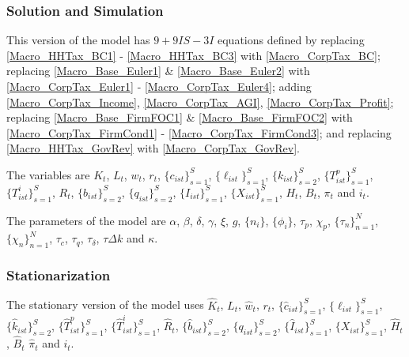 \documentclass[letterpaper,12pt]{article}
\theoremstyle{definition}
\numberwithin{equation}{section}
\begin{document}
\begin{spacing}{1.5}
    \subsubsection{Solution and Simulation}
      This version of the model has $9+9IS-3I$ equations defined by replacing \eqref{Macro_HHTax_BC1} - \eqref{Macro_HHTax_BC3} with \eqref{Macro_CorpTax_BC}; replacing \eqref{Macro_Base_Euler1} \& \eqref{Macro_Base_Euler2} with \eqref{Macro_CorpTax_Euler1} - \eqref{Macro_CorpTax_Euler4}; adding \eqref{Macro_CorpTax_Income}, \eqref{Macro_CorpTax_AGI}, \eqref{Macro_CorpTax_Profit}; replacing \eqref{Macro_Base_FirmFOC1} \& \eqref{Macro_Base_FirmFOC2} with \eqref{Macro_CorpTax_FirmCond1} - \eqref{Macro_CorpTax_FirmCond3}; and replacing \eqref{Macro_HHTax_GovRev} with \eqref{Macro_CorpTax_GovRev}.  

      The variables are $K_t$, $L_t$, $w_t$, $r_t$, $\{c_{ist}\}_{s=1}^S$, $\{\ell_{ist}\}_{s=1}^S$, $\{k_{ist}\}_{s=2}^S$, $\{T^p_{ist}\}_{s=1}^S$, $\{T^i_{ist}\}_{s=1}^S$, $R_t$, $\{b_{ist}\}_{s=2}^S$, $\{q_{ist}\}_{s=2}^S$, $\{I_{ist}\}_{s=1}^S$, $\{X_{ist}\}_{s=1}^S$, $H_t$, $B_t$, $\pi_t$ and $i_t$.

      The parameters of the model are $\alpha$, $\beta$, $\delta$, $\gamma$, $\xi$, $g$, $\{n_i\}$, $\{\phi_i\}$, $\tau_p$, $\chi_p$, $\{\tau_n\}_{n=1}^N$, $\{\chi_n\}_{n=1}^N$, $\tau_c$, $\tau_q$, $\tau_\delta$, $\tau{\Delta k}$ and $\kappa$.

    \subsubsection{Stationarization}
      The stationary version of the model uses $\hat K_t$, $L_t$, $\hat w_t$, $r_t$, $\{\hat c_{ist}\}_{s=1}^S$, $\{\ell_{ist}\}_{s=1}^S$, $\{\hat k_{ist}\}_{s=2}^S$, $\{\hat T^p_{ist}\}_{s=1}^S$, $\{\hat T^i_{ist}\}_{s=1}^S$, $\hat R_t$, $\{\hat b_{ist}\}_{s=2}^S$, $\{q_{ist}\}_{s=2}^S$, $\{\hat I_{ist}\}_{s=1}^S$, $\{X_{ist}\}_{s=1}^S$, $\hat H_t$, $\hat B_t$ $\hat \pi_t$ and $i_t$.


\end{spacing}
\end{document}

